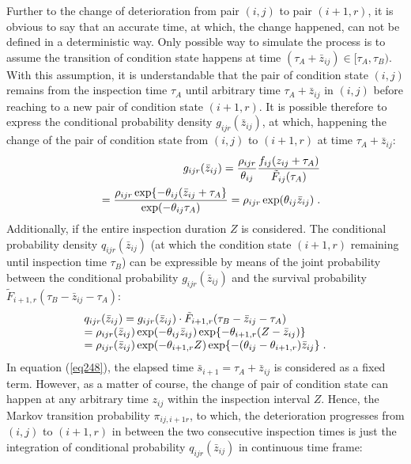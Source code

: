 Further to the change of deterioration from pair $(i,j)$ to pair $(i+1,r)$, it is obvious to say that an accurate time, at which, the change happened, can not be defined in a deterministic way. Only possible way to simulate the process is to assume the transition of condition state happens at time $(\tau_A+\bar z_{ij})\in [\tau_A,\tau_B)$. With this assumption, it is understandable that the pair of condition state $(i,j)$ remains from the inspection time $\tau_A$ until arbitrary time $\tau_A+\bar z_{ij}$ in $(i,j)$ before reaching to a new pair of condition state $(i+1,r)$. It is possible therefore to express the conditional probability density $g_{ijr}(\bar z_{ij})$, at which, happening the change of the pair of condition state from  $(i,j)$ to $(i+1,r)$ at time $\tau_A+\bar z_{ij}$:
\begin{eqnarray}
&& g_{ijr} (\bar z_{ij} ) = \frac{{\rho _{ijr} }}{{\theta _{ij} }}\frac{{f_{ij} (z_{ij}  + \tau _A )}}{{\tilde F_{ij} (\tau _A )}} \nonumber \\ 
&& = \frac{{\rho _{ijr} \exp \{  - \theta _{ij} (\bar z_{ij}  + \tau _A \} }}{{\exp ( - \theta _{ij} \tau _A )}} = \rho _{ijr} \exp (\theta _{ij} \bar z_{ij} )\hspace{1mm}.
\end{eqnarray}
Additionally, if the entire inspection duration $Z$ is considered. The conditional probability density $q_{ijr} (\bar z_{ij})$ (at which the condition state $(i+1,r)$ remaining until inspection time $\tau_B$) can be expressible by means of the joint probability between the conditional probability $g_{ijr}(\bar z_{ij})$ and the survival probability $\tilde F_{i + 1,r} (\tau _B - \bar z_{ij} - \tau _A )$:
\begin{eqnarray}
\begin{array}{l}
 q_{ijr} (\bar z_{ij} ) = g_{ijr} (\bar z_{ij} ) \cdot \tilde F_{i + 1,r} (\tau _B  - \bar z_{ij}  - \tau _A ) \\ 
  = \rho _{ijr} (\bar z_{ij} )\exp ( - \theta _{ij} \bar z_{ij} )\exp \{  - \theta _{i + 1,r} (Z - \bar z_{ij} )\}  \\ 
  = \rho _{ijr} (\bar z_{ij} )\exp ( - \theta _{i + 1,r} Z)\exp \{  - (\theta _{ij}  - \theta _{i + 1,r} )\bar z_{ij} \}  \hspace{1mm}.\\ 
 \end{array} \label{eq248}
\end{eqnarray}
In equation (\ref{eq248}), the elapsed time $\bar s_{i+1}=\tau_A+\bar z_{ij}$ is considered as a fixed term. However, as a matter of course, the change of pair of condition state can happen at any arbitrary time $z_{ij}$ within the inspection interval $Z$. Hence, the Markov transition probability $\pi_{ij,i+1r}$, to which, the deterioration progresses from $(i,j)$ to $(i+1,r)$ in between the two consecutive inspection times is just the integration of conditional probability $q_{ijr} (\bar z_{ij} )$ in continuous time frame:
